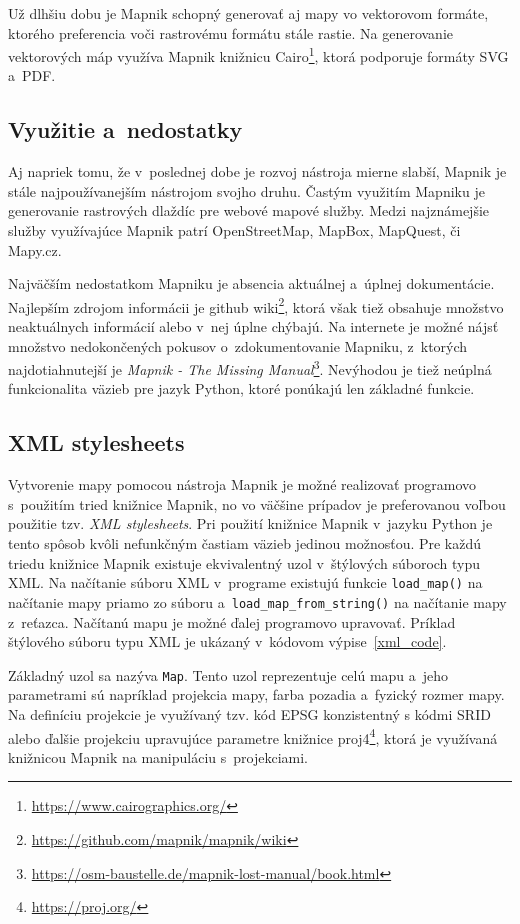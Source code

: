 Už dlhšiu dobu je Mapnik schopný generovať aj mapy vo vektorovom formáte, ktorého preferencia voči rastrovému formátu stále rastie. Na generovanie vektorových máp využíva Mapnik knižnicu Cairo\footnote{\url{https://www.cairographics.org/}}, ktorá podporuje formáty SVG a~PDF.

\subsection*{Využitie a~nedostatky}
Aj napriek tomu, že v~poslednej dobe je rozvoj nástroja mierne slabší, Mapnik je stále najpoužívanejším nástrojom svojho druhu. Častým využitím Mapniku je generovanie rastrových dlaždíc pre webové mapové služby. Medzi najznámejšie služby využívajúce Mapnik patrí OpenStreetMap, MapBox, MapQuest, či Mapy.cz.

Najväčším nedostatkom Mapniku je absencia aktuálnej a~úplnej dokumentácie. Najlepším zdrojom informácii je github wiki\footnote{\url{https://github.com/mapnik/mapnik/wiki}}, ktorá však tiež obsahuje množstvo neaktuálnych informácií alebo v~nej úplne chýbajú. Na internete je možné nájsť množstvo nedokončených pokusov o~zdokumentovanie Mapniku, z~ktorých najdotiahnutejší je {\it Mapnik - The Missing Manual}\footnote{\url{https://osm-baustelle.de/mapnik-lost-manual/book.html}}. Nevýhodou je tiež neúplná funkcionalita väzieb pre jazyk Python, ktoré ponúkajú len základné funkcie.

\subsection*{XML stylesheets}
\label{xml}
Vytvorenie mapy pomocou nástroja Mapnik je možné realizovať programovo s~použitím tried knižnice Mapnik, no vo väčšine prípadov je preferovanou voľbou použitie tzv. {\it XML stylesheets}. Pri použití knižnice Mapnik v~jazyku Python je tento spôsob kvôli nefunkčným častiam väzieb jedinou možnosťou. Pre každú triedu knižnice Mapnik existuje ekvivalentný uzol v~štýlových súboroch typu XML. Na načítanie súboru XML v~programe existujú funkcie {\tt load\_map()} na načítanie mapy priamo zo súboru a~{\tt load\_map\_from\_string()} na načítanie mapy z~reťazca. Načítanú mapu je možné ďalej programovo upravovať. Príklad štýlového súboru typu XML je ukázaný v~kódovom výpise~\ref{xml_code}.

Základný uzol sa nazýva {\tt Map}. Tento uzol reprezentuje celú mapu a~jeho parametrami sú napríklad projekcia mapy, farba pozadia a~fyzický rozmer mapy. Na definíciu projekcie je využívaný tzv. kód EPSG konzistentný s kódmi SRID alebo ďalšie projekciu upravujúce parametre knižnice proj4\footnote{\url{https://proj.org/}}, ktorá je využívaná knižnicou Mapnik na manipuláciu s~projekciami.


